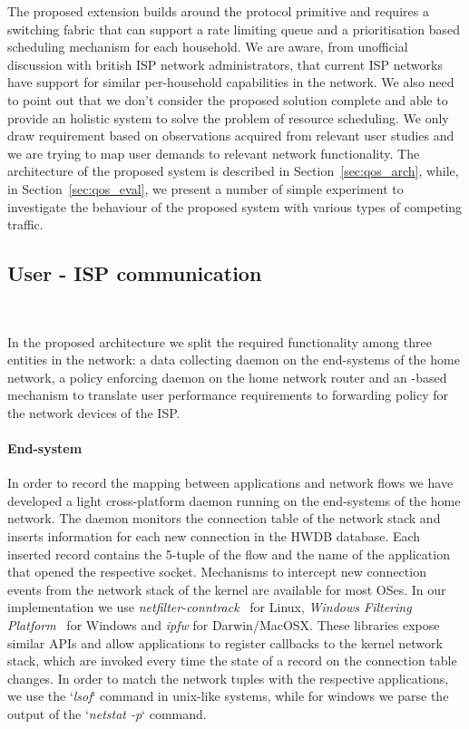 The proposed extension builds around the \of protocol primitive and requires a
switching fabric that can support a rate limiting queue and a prioritisation
based scheduling mechanism for each household. We are aware, from unofficial
discussion with british ISP network administrators, that current ISP networks
have support for similar per-household capabilities in the network. We also need
to point out that we don't consider the proposed solution complete and able to
provide an holistic system to solve the problem of resource scheduling. We only
draw requirement based on observations acquired from relevant user studies and
we are trying to map user demands to relevant network functionality. The
architecture of the proposed system is described in Section~\ref{sec:qos_arch},
while, in Section~\ref{sec:qos_eval}, we present a number of simple experiment
to investigate the behaviour of the proposed system with various types of
competing traffic.

\subsection{User - ISP communication} ~\label{sec:qos_arch}

In the proposed architecture we split the required functionality among three
entities in the network: a data collecting daemon on the end-systems of the home
network, a policy enforcing daemon on the home network router and an
\of-based mechanism to translate user performance requirements to
forwarding policy for the network devices of the ISP.

\paragraph*{End-system}
In order to record the mapping between applications and network flows we have
developed a light cross-platform daemon running on the end-systems of the home
network.  The daemon monitors the connection table of the network stack and
inserts information for each new connection in the HWDB database.  Each inserted
record contains the 5-tuple of the flow and the name of the application that
opened the respective socket.  Mechanisms to intercept new connection events
from the network stack of the kernel are available for most OSes. In our
implementation we use {\it netfilter-conntrack}~\cite{netfilter-conntrack} for
Linux, {\it Windows Filtering Platform}~\cite{win-wfp} for Windows and {\it
  ipfw} for Darwin/MacOSX. These libraries expose similar APIs and allow
applications to register callbacks to the kernel network stack, which are
invoked every time the state of a record on the connection table changes. In
order to match the network tuples with the respective applications, we use the
`{\it lsof}` command in unix-like systems, while for windows we parse the output
of the `{\it netstat -p}` command.

